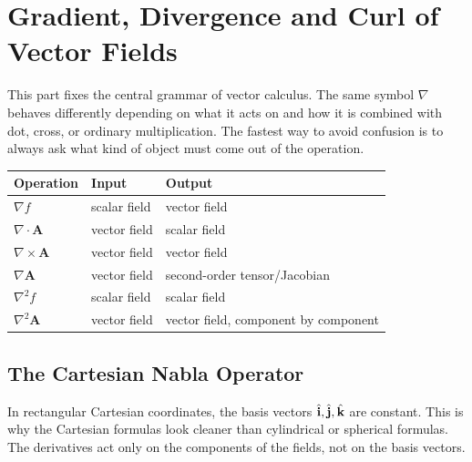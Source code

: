 \documentclass{otscience}
\begin{document}
\maketitle
\tableofcontents
\newpage
\fi

\section{Gradient, Divergence and Curl of Vector Fields}

This part fixes the central grammar of vector calculus. The same symbol \(\nabla\) behaves differently depending on what it acts on and how it is combined with dot, cross, or ordinary multiplication. The fastest way to avoid confusion is to always ask what kind of object must come out of the operation.

\begin{center}
    \begin{tabularx}{\textwidth}{>{\bfseries}l X l}
        \toprule
        Operation                  & Input        & Output                               \\
        \midrule
        \(\nabla f\)               & scalar field & vector field                         \\
        \(\nabla\cdot\mathbf{A}\)  & vector field & scalar field                         \\
        \(\nabla\times\mathbf{A}\) & vector field & vector field                         \\
        \(\nabla\mathbf{A}\)       & vector field & second-order tensor/Jacobian         \\
        \(\nabla^2 f\)             & scalar field & scalar field                         \\
        \(\nabla^2\mathbf{A}\)     & vector field & vector field, component by component \\
        \bottomrule
    \end{tabularx}
\end{center}

\subsection{The Cartesian Nabla Operator}

In rectangular Cartesian coordinates, the basis vectors \(\hat{\mathbf{i}},\hat{\mathbf{j}},\hat{\mathbf{k}}\) are constant. This is why the Cartesian formulas look cleaner than cylindrical or spherical formulas. The derivatives act only on the components of the fields, not on the basis vectors.
\end{document}
